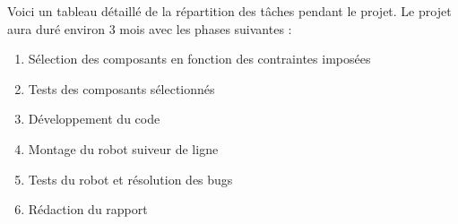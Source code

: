 Voici un tableau détaillé de la répartition des tâches pendant le projet.
Le projet aura duré environ 3 mois avec les phases suivantes :
\begin{enumerate}
    \item Sélection des composants en fonction des contraintes imposées
    \item Tests des composants sélectionnés
    \item Développement du code
    \item Montage du robot suiveur de ligne
    \item Tests du robot et résolution des bugs
    \item Rédaction du rapport
\end{enumerate}

\newpage
